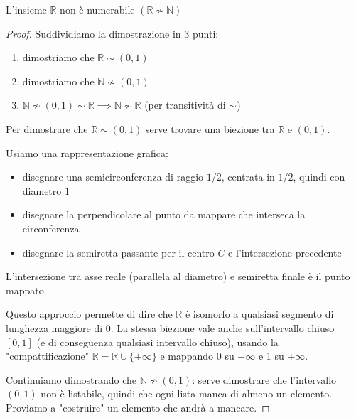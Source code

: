 \begin{theor}
	L'insieme $\mathbb{R}$ non è numerabile $(\mathbb{R} \nsim \mathbb{N})$
\end{theor}
\begin{proof}
	Suddividiamo la dimostrazione in 3 punti: 
	\begin{enumerate}
		\item dimostriamo che $\mathbb{R} \sim (0,1)$
		
        \item dimostriamo che $\mathbb{N} \nsim (0,1)$
		
        \item $\mathbb{N} \nsim (0,1) \sim \mathbb{R} \implies \mathbb{N} \nsim \mathbb{R}$ (per transitività di $\sim$)
	\end{enumerate}
	
	Per dimostrare che $\mathbb{R} \sim (0,1)$ serve trovare una biezione tra $\mathbb{R}$ e $(0,1)$. 
    
    Usiamo una rappresentazione grafica:
	\begin{itemize}
		\item disegnare una semicirconferenza di raggio $1/2$, centrata in $1/2$, quindi con diametro $1$
	
    	\item disegnare la perpendicolare al punto da mappare che interseca la circonferenza
	
    	\item disegnare la semiretta passante per il centro $C$ e l'intersezione precedente
	\end{itemize}
	L'intersezione tra asse reale (parallela al diametro) e semiretta finale è il punto mappato. 
	
	\begin{center}
		
	  \end{center}
    
	\vspace{-2.8cm}
	
	Questo approccio permette di dire che $\mathbb{R}$ è isomorfo a qualsiasi segmento di lunghezza maggiore di $0$. La stessa biezione vale anche sull'intervallo chiuso $[0,1]$ (e di conseguenza qualsiasi intervallo chiuso), usando la "compattificazione" $\mathbb{R} = \mathbb{R} \cup \{\pm \infty\}$ e mappando $0$ su $-\infty$ e 1 su $+ \infty$.
	
	Continuiamo dimostrando che $\mathbb{N} \nsim (0,1)$: serve dimostrare che l'intervallo $(0,1)$ non è listabile, quindi che ogni lista manca di almeno un elemento. Proviamo a "costruire" un elemento che andrà a mancare. 
    

\end{proof}
